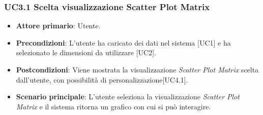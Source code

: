 \subsubsection{UC3.1 Scelta visualizzazione Scatter Plot Matrix}
\begin{itemize}
	\item \textbf{Attore primario}: Utente.
	\item \textbf{Precondizioni}: L'utente ha caricato dei dati nel sistema [UC1] e ha selezionato le dimensioni da utilizzare [UC2].
	\item \textbf{Postcondizioni}: Viene mostrata la visualizzazione \textit{Scatter Plot Matrix} scelta dall'utente, con possibilità di personalizzazione[UC4.1].
	\item \textbf{Scenario principale}: L'utente seleziona la visualizzazione \textit{Scatter Plot Matrix} e il sistema ritorna un grafico con cui si può interagire.
\end{itemize}